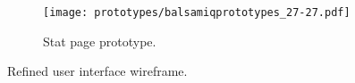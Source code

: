 \documentclass{l4proj}
\begin{document}
\begin{appendices}
\begin{figure}[!ht]
    \centering
    \begin{subfigure}[b]{0.45\textwidth}
        \texttt{[image: prototypes/balsamiqprototypes\_27-27.pdf]}
        \caption{Stat page prototype.}
        \label{fig:ref21}
    \end{subfigure}
    \caption{Refined user interface wireframe.}
    \label{fig:prototypes12}
\end{figure}


  
\end{appendices}






\end{document}
